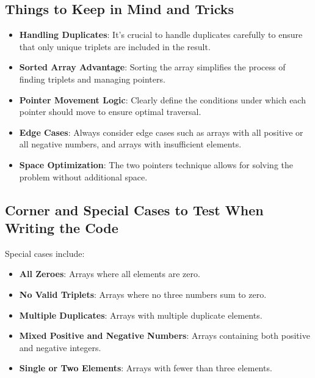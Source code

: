 \subsection*{Things to Keep in Mind and Tricks}
\begin{itemize}
    \item \textbf{Handling Duplicates}: It's crucial to handle duplicates carefully to ensure that only unique triplets are included in the result.
    \item \textbf{Sorted Array Advantage}: Sorting the array simplifies the process of finding triplets and managing pointers.
    \item \textbf{Pointer Movement Logic}: Clearly define the conditions under which each pointer should move to ensure optimal traversal.
    \item \textbf{Edge Cases}: Always consider edge cases such as arrays with all positive or all negative numbers, and arrays with insufficient elements.
    \item \textbf{Space Optimization}: The two pointers technique allows for solving the problem without additional space.
\end{itemize}

\subsection*{Corner and Special Cases to Test When Writing the Code}
Special cases include:
\begin{itemize}
    \item \textbf{All Zeroes}: Arrays where all elements are zero.
    \item \textbf{No Valid Triplets}: Arrays where no three numbers sum to zero.
    \item \textbf{Multiple Duplicates}: Arrays with multiple duplicate elements.
    \item \textbf{Mixed Positive and Negative Numbers}: Arrays containing both positive and negative integers.
    \item \textbf{Single or Two Elements}: Arrays with fewer than three elements.
\end{itemize}

